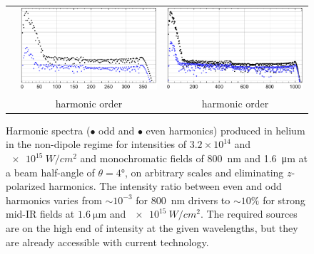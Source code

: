 {\begin{figure}[ht]
\begin{tabular}{ccc}
    &
 \includegraphics[height=\figureNineEheight]{9-Nondipole-HHG/Figures/figure9Ec.pdf}
    & 
 \includegraphics[height=\figureNineEheight]{9-Nondipole-HHG/Figures/figure9Ed.pdf}
   \\[2mm]
    & harmonic order & harmonic order 
  \end{tabular}
  \caption[
  Harmonic spectra for reasonable fields at $\SI{800}{nm}$ and $\SI{1.6}{\micro\metre}$, and intensities $3.2\times 10^{14}$ and $\SI{e15}{W/cm^2}$, showing measurable even-harmonics signals for non-collinear beams
  ]{
  Harmonic spectra ($\bullet$ odd and {\color{blue!80}$\bullet$} even harmonics) produced in helium in the non-dipole regime for intensities of $3.2\times 10^{14}$ and $\SI{e15}{W/cm^2}$ and monochromatic fields of \SI{800}{nm} and \SI{1.6}{\micro\metre} at a beam half-angle of $\theta=4\si{\degree}$, on arbitrary scales and eliminating $z$-polarized harmonics. The intensity ratio between even and odd harmonics varies from ${\sim}10^{-3}$ for \SI{800}{nm} drivers to ${\sim}10\%$ for strong mid-IR fields at $\SI{1.6}{\micro\metre}$ and $\SI{e15}{W/cm^2}$. The required sources are on the high end of intensity at the given wavelengths, but they are already accessible with current technology.
  }
\label{f9-even-harmonics-spectra}
\end{figure}
}






